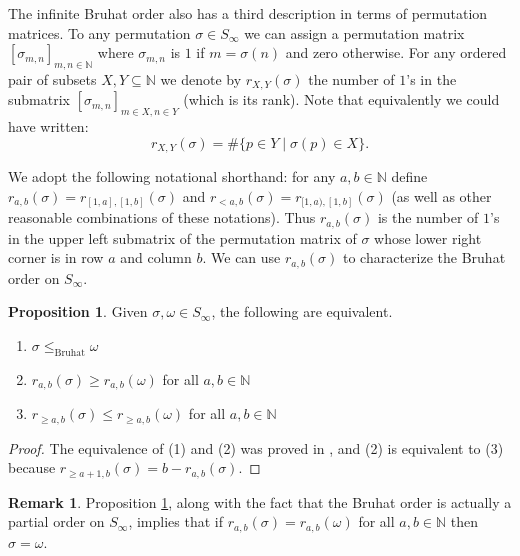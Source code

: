 \documentclass[oneside,11pt,reqno]{amsart}
\newcommand{\nn}{\ensuremath{\mathbb{N}}}
\theoremstyle{definition}
\newtheorem{remark}{Remark}
\newtheorem{proof techniques}{Proof Techniques}
\newtheorem{proposition}{Proposition}
\begin{document}

The infinite Bruhat order also has a third description in terms of permutation matrices. To any permutation $\sigma \in S_\infty$ we can assign a permutation matrix $[\sigma_{m ,n}]_{m , n \in \nn}$ where $\sigma_{m , n}$ is $1$ if $m = \sigma(n)$ and zero otherwise. For any ordered pair of subsets $X , Y \subseteq \nn$ we denote by $r_{X , Y}(\sigma)$ the number of $1$'s in the submatrix $[\sigma_{m , n}]_{m \in X, n \in Y}$ (which is its rank). Note that equivalently we could have written: 
\begin{equation*}
    r_{X , Y}(\sigma) = \# \{ p \in Y \mid \sigma(p) \in X \}.
\end{equation*} 

We adopt the following notational shorthand: for any $a , b \in \nn$ define $r_{a , b}(\sigma) = r_{[1, a],[1 , b]}(\sigma)$ and $r_{<a , b}(\sigma) = r_{[1, a),[1 , b]}(\sigma)$ (as well as other reasonable combinations of these notations). Thus $r_{a , b}(\sigma)$ is the number of $1$'s in the upper left submatrix of the permutation matrix of $\sigma$ whose lower right corner is in row $a$ and column $b$. We can use $r_{a , b}(\sigma)$ to characterize the Bruhat order on $S_\infty$. 

\begin{proposition}\label{prop: region criterion for bruhat order}
Given $\sigma, \omega \in S_\infty$, the following are equivalent. 

\begin{enumerate}
    \item $\sigma \leq_\text{Bruhat} \omega$
    \item $r_{a , b}(\sigma) \geq r_{a , b}(\omega)$ for all $a , b \in \nn$
    \item $r_{\geq a , b}(\sigma) \leq r_{\geq a , b}(\omega)$ for all $a , b \in \nn$
\end{enumerate}
\end{proposition}

\begin{proof}
The equivalence of (1) and (2) was proved in \cite[Proposition 27]{gallup2021well}, and (2) is equivalent to (3) because $r_{\geq a + 1 , b}(\sigma) = b - r_{a , b}(\sigma)$. 
\end{proof}

\begin{remark}\label{rmk: rs equal implies permutations are equal}
    Proposition \ref{prop: region criterion for bruhat order}, along with the fact that the Bruhat order is actually a partial order on $S_\infty$, implies that if $r_{a , b}(\sigma) = r_{a , b}(\omega)$ for all $a , b \in \nn$ then $\sigma = \omega$. 
\end{remark}
\end{document}
